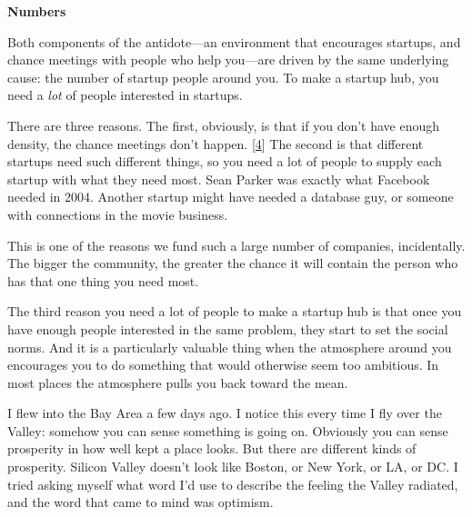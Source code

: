 \textbf{Numbers}

Both components of the antidote---an
                    environment that encourages startups, and chance meetings
                    with people who help you---are driven by the same
                    underlying cause: the number of startup people around you.
                    To make a startup hub, you need a \emph{lot} of people
                    interested in startups.

There are three reasons.
                    The first, obviously, is that if you don't have enough
                    density, the chance meetings don't happen.
                    [\href{\#f4n}{4}]
                    The second is that different startups need such different
                    things, so you need a lot of people to supply each startup
                    with what they need most. Sean Parker was exactly what
                    Facebook needed in 2004. Another startup might have needed a
                    database guy, or someone with connections in the movie
                    business.

This is one of the reasons we fund such
                    a large number of companies, incidentally. The bigger the
                    community, the greater the chance it will contain the person
                    who has that one thing you need most.

The third
                    reason you need a lot of people to make a startup hub is
                    that once you have enough people interested in the same
                    problem, they start to set the social norms. And it is a
                    particularly valuable thing when the atmosphere around you
                    encourages you to do something that would otherwise seem too
                    ambitious. In most places the atmosphere pulls you back
                    toward the mean.

I flew into the Bay Area a few
                    days ago. I notice this every time I fly over the Valley:
                    somehow you can sense something is going on. Obviously you
                    can sense prosperity in how well kept a place looks. But
                    there are different kinds of prosperity. Silicon Valley
                    doesn't look like Boston, or New York, or LA, or DC. I tried
                    asking myself what word I'd use to describe the feeling the
                    Valley radiated, and the word that came to mind was
                    optimism.





